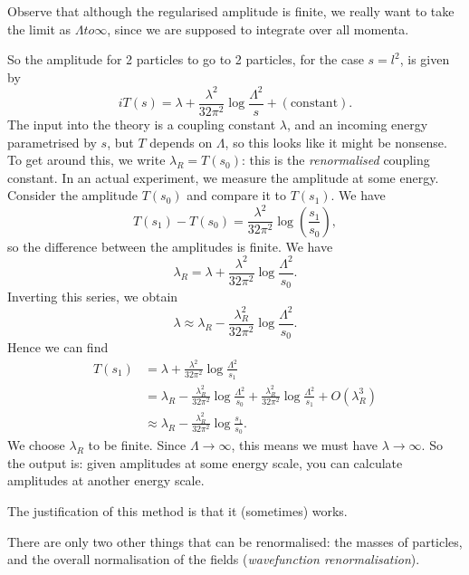 \documentclass{jknotes} %
\begin{document}
Observe that although the regularised amplitude is finite, we really want to take the limit as \(\Lambda to \infty\), since we are supposed to integrate over all momenta.

So the amplitude for 2 particles to go to 2 particles, for the case \(s=l^2\), is given by
\begin{equation}
    iT(s) = \lambda + \frac{\lambda^2}{32\pi^2}\log\frac{\Lambda^2}{s} + (\text{constant}).
\end{equation}
The input into the theory is a coupling constant \(\lambda\), and an incoming energy parametrised by \(s\), but \(T\) depends on \(\Lambda\), so this looks like it might be nonsense. To get around this, we write \(\lambda_R=T(s_0)\): this is the \emph{renormalised} coupling constant. In an actual experiment, we measure the amplitude at some energy. Consider the amplitude \(T(s_0)\) and compare it to \(T(s_1)\). We have
\begin{equation}
    T(s_1)-T(s_0) = \frac{\lambda^2}{32\pi^2}\log(\frac{s_1}{s_0}),
\end{equation}
so the difference between the amplitudes is finite. We have
\begin{equation}
    \lambda_R = \lambda + \frac{\lambda^2}{32\pi^2}\log\frac{\Lambda^2}{s_0}.
\end{equation}
Inverting this series, we obtain
\begin{equation}
    \lambda \approx \lambda_R - \frac{\lambda_R^2}{32\pi^2}\log\frac{\Lambda^2}{s_0}.
\end{equation}
Hence we can find
\begin{align}
    T(s_1) &= \lambda + \frac{\lambda^2}{32\pi^2}\log\frac{\Lambda^2}{s_1} \\
           &= \lambda_R - \frac{\lambda_R^2}{32\pi^2}\log\frac{\Lambda^2}{s_0} + \frac{\lambda_R^2}{32\pi^2}\log\frac{\Lambda^2}{s_1} + O(\lambda_R^3) \\
           &\approx \lambda_R - \frac{\lambda_R^2}{32\pi^2}\log\frac{s_1}{s_0}.
\end{align}
We choose \(\lambda_R\) to be finite. Since \(\Lambda \to \infty\), this means we must have \(\lambda \to \infty\). So the output is: given amplitudes at some energy scale, you can calculate amplitudes at another energy scale.

The justification of this method is that it (sometimes) works.

There are only two other things that can be renormalised: the masses of particles, and the overall normalisation of the fields (\emph{wavefunction renormalisation}).
\end{document}

